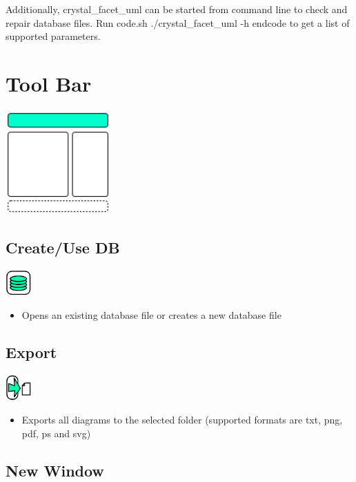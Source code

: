Additionally, crystal\_facet\_uml can be started from command line
to check and repair database files.
Run
code{.sh}
./crystal\_facet\_uml -h
endcode
to get a list of supported parameters.

\section{Tool Bar}

\includegraphics[width=4cm]{main_window_sketch_1.png}

\subsection{Create/Use DB}

\includegraphics[width=1cm]{../../gui/source/resources/file_use_db.pdf}
\begin{itemize}
\item Opens an existing database file or creates a new database file
\end{itemize}

\subsection{Export}

\includegraphics[width=1cm]{../../gui/source/resources/file_export.pdf}
\begin{itemize}
\item Exports all diagrams to the selected folder (supported formats are txt, png, pdf, ps and svg)
\end{itemize}

\subsection{New Window}


